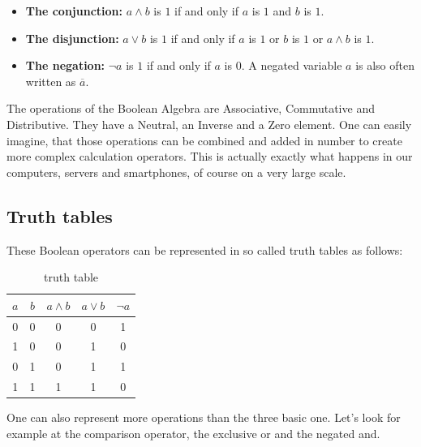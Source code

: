 \begin{itemize}
 \item \textbf{The conjunction:} $a\land b$ is $1$ if and only if $a$ is $1$ and $b$ is $1$.\\
 \item \textbf{The disjunction:} $a\lor b$  is $1$ if and only if $a$ is $1$ or $b$ is $1$ or $a\wedge b$ is $1$.\\
 \item \textbf{The negation:}  $\neg a$ is $1$ if and only if $a$ is $0$. A negated variable $a$ is also often written as $\overline{a}$.
\end{itemize}

\noindent
The operations of the Boolean Algebra are Associative, Commutative and Distributive. They have a Neutral, an Inverse and a Zero element. One can easily imagine, that those operations can be combined and added in number to create more complex calculation operators. This is actually exactly what happens in our computers, servers and smartphones, of course on a very large scale. 
\subsection{Truth tables}
These Boolean operators can be represented in so called truth tables as follows:


\begin{table}[H]
\centering
\begin{tabular}{c|c|c|c|c}
\textbf{$a$} & \textbf{$b$} & \textbf{$a\land b$} & \textbf{$a\lor b$} & \textbf{$\neg a$} \\ \hline
0          & 0          & 0            & 0            & 1           \\
1          & 0          & 0            & 1            & 0           \\
0          & 1          & 0            & 1            & 1           \\
1          & 1          & 1            & 1            & 0          
\end{tabular}
\caption{truth table}
\label{tab:truth}
\end{table}

One can also represent more operations than the three basic one. Let's look for example at the comparison operator, the exclusive or and the negated and. 


